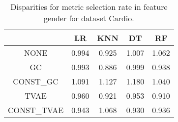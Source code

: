 \begin{table}
\caption{Disparities for metric selection rate in feature gender for dataset Cardio.}
\label{tab:disp-CARDIO-gender-selection_rate}
\begin{tabular}{ccccc}
\toprule
 & LR & KNN & DT & RF \\
\midrule
NONE & 0.994 & 0.925 & 1.007 & 1.062 \\
GC & 0.993 & 0.886 & 0.999 & 0.938 \\
CONST\_GC & 1.091 & 1.127 & 1.180 & 1.040 \\
TVAE & 0.960 & 0.921 & 0.953 & 0.910 \\
CONST\_TVAE & 0.943 & 1.068 & 0.930 & 0.936 \\
\bottomrule
\end{tabular}
\end{table}
